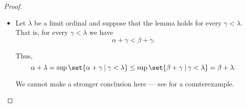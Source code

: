 \begin{proof}
\begin{itemize}
    \item Let \( \lambda \) be a limit ordinal and suppose that the lemma holds for every \( \gamma < \lambda \). That is, for every \( \gamma < \lambda \) we have
    \begin{equation*}
      \alpha + \gamma < \beta + \gamma.
    \end{equation*}

    Thus,
    \begin{equation*}
      \alpha + \lambda
      =
      \sup\set{ \alpha + \gamma \given \gamma < \lambda }
      \leq
      \sup\set{ \beta + \gamma \given \gamma < \lambda }
      =
      \beta + \lambda.
    \end{equation*}

    We cannot make a stronger conclusion here --- see  for a counterexample.
  \end{itemize}
\end{proof}

